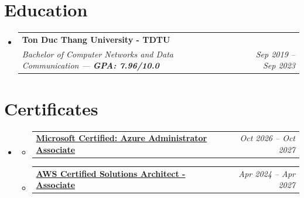 \documentclass[letterpaper,11pt]{article}
\makeatletter
\newcommand{\resumeSubheading}[4]{
  \vspace{-2pt}\item
  \begin{tabular*}{0.97\textwidth}[t]{l@{\extracolsep{\fill}}r}
    \textbf{#1} & #2 \\
    \textit{\small#3} & \textit{\small #4} \\
  \end{tabular*}\vspace{-7pt}
}
\newcommand{\resumeCertificateListStart}{\vspace{-2pt}\item\begin{itemize}[leftmargin=0pt, label={}, itemsep=4pt]}
\newcommand{\resumeCertificate}[2]{
  \item
  \begin{tabular*}{\dimexpr\linewidth-0.03\textwidth+0.15in\relax}[t]{l@{\extracolsep{\fill}}r}
    \textbf{#1} & \textit{\small #2} \\
  \end{tabular*}\vspace{-2pt}
}
\newcommand{\resumeCertificateListEnd}{\end{itemize}\vspace{-5pt}}
\newcommand{\resumeSubHeadingListStart}{\begin{itemize}[leftmargin=0.15in, label={}]}
\newcommand{\resumeSubHeadingListEnd}{\end{itemize}}
\makeatother
\begin{document}

\section{Education}
\vspace{3pt}
\resumeSubHeadingListStart
    \resumeSubheading
      {Ton Duc Thang University - TDTU}{}%
      {Bachelor of Computer Networks and Data Communication --- \textbf{GPA: 7.96/10.0}}{Sep 2019 -- Sep 2023}
\resumeSubHeadingListEnd


\section{Certificates}
\vspace{3pt}
\resumeSubHeadingListStart
  \resumeCertificateListStart
    \resumeCertificate
      {\href{https://learn.microsoft.com/api/credentials/share/en-us/maihoangviet/6A167E00FD612689?sharingId=2E5AF5B38CC0ED0F}{Microsoft Certified: Azure Administrator Associate}}{Oct 2026 -- Oct 2027}
    \resumeCertificate
      {\href{https://www.credly.com/badges/17055723-5368-43af-9258-7b1df26e8d0b/public_url}{AWS Certified Solutions Architect - Associate}}{Apr 2024 -- Apr 2027}
  \resumeCertificateListEnd
\resumeSubHeadingListEnd
\end{document}
